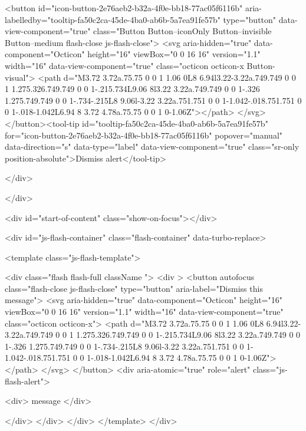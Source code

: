    <button id="icon-button-2e76aeb2-b32a-4f0e-bb18-77ac05f6116b" aria-labelledby="tooltip-fa50c2ca-45de-4ba0-ab6b-5a7ea91fe57b" type="button" data-view-component="true" class="Button Button--iconOnly Button--invisible Button--medium flash-close js-flash-close">  <svg aria-hidden="true" data-component="Octicon" height="16" viewBox="0 0 16 16" version="1.1" width="16" data-view-component="true" class="octicon octicon-x Button-visual">
    <path d="M3.72 3.72a.75.75 0 0 1 1.06 0L8 6.94l3.22-3.22a.749.749 0 0 1 1.275.326.749.749 0 0 1-.215.734L9.06 8l3.22 3.22a.749.749 0 0 1-.326 1.275.749.749 0 0 1-.734-.215L8 9.06l-3.22 3.22a.751.751 0 0 1-1.042-.018.751.751 0 0 1-.018-1.042L6.94 8 3.72 4.78a.75.75 0 0 1 0-1.06Z"></path>
</svg>
</button><tool-tip id="tooltip-fa50c2ca-45de-4ba0-ab6b-5a7ea91fe57b" for="icon-button-2e76aeb2-b32a-4f0e-bb18-77ac05f6116b" popover="manual" data-direction="s" data-type="label" data-view-component="true" class="sr-only position-absolute">Dismiss alert</tool-tip>


  
</div>
        
          
    </div>

  <div id="start-of-content" class="show-on-focus"></div>








    <div id="js-flash-container" class="flash-container" data-turbo-replace>




  <template class="js-flash-template">
    
<div class="flash flash-full   {{ className }}">
  <div >
    <button autofocus class="flash-close js-flash-close" type="button" aria-label="Dismiss this message">
      <svg aria-hidden="true" data-component="Octicon" height="16" viewBox="0 0 16 16" version="1.1" width="16" data-view-component="true" class="octicon octicon-x">
    <path d="M3.72 3.72a.75.75 0 0 1 1.06 0L8 6.94l3.22-3.22a.749.749 0 0 1 1.275.326.749.749 0 0 1-.215.734L9.06 8l3.22 3.22a.749.749 0 0 1-.326 1.275.749.749 0 0 1-.734-.215L8 9.06l-3.22 3.22a.751.751 0 0 1-1.042-.018.751.751 0 0 1-.018-1.042L6.94 8 3.72 4.78a.75.75 0 0 1 0-1.06Z"></path>
</svg>
    </button>
    <div aria-atomic="true" role="alert" class="js-flash-alert">
      
      <div>{{ message }}</div>

    </div>
  </div>
</div>
  </template>
</div>


